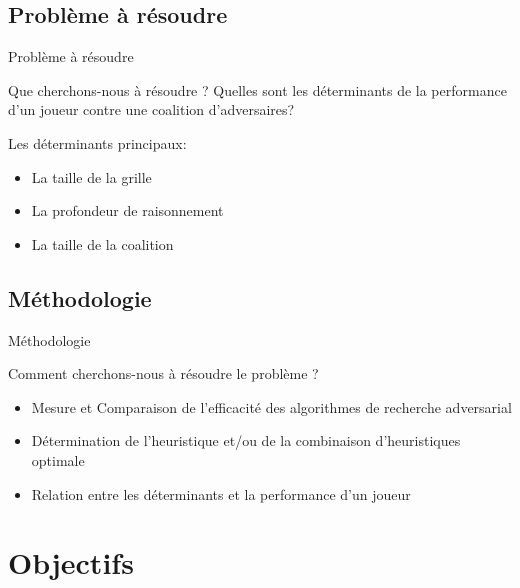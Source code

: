 \documentclass{beamer}
\begin{document}
    \subsection*{Problème à résoudre}
    \begin{frame}{Problème à résoudre}
        \begin{block}{Que cherchons-nous à résoudre ?}
            \pause
            Quelles sont les déterminants de la performance d'un joueur contre une coalition d'adversaires?\pause
        \end{block}
        \begin{block}{Les déterminants principaux:}
            \begin{itemize}
                [<+->]
                \item La taille de la grille
                \item La profondeur de raisonnement
                \item La taille de la coalition
            \end{itemize}
        \end{block}
    \end{frame}

    \subsection*{Méthodologie}
    \begin{frame}{Méthodologie}
        \begin{block}{Comment cherchons-nous à résoudre le problème ?}
            \begin{itemize}
                \item Mesure et Comparaison de l'efficacité des algorithmes de recherche adversarial
                \item Détermination de l'heuristique et/ou de la combinaison d'heuristiques optimale
                \item Relation entre les déterminants et la performance d'un joueur
            \end{itemize}
        \end{block}
    \end{frame}


    \section{Objectifs}
\end{document}
